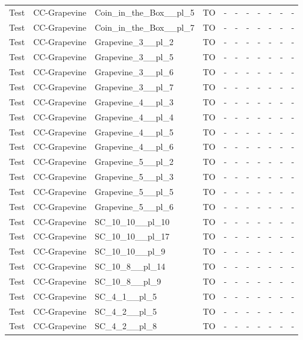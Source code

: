 \documentclass{article}
\begin{document}
\begin{tabular}{lllcccccccc}
Test & CC-Grapevine & Coin\_in\_the\_Box\_\_pl\_5 & TO & - & - & - & - & - & - & - \\
Test & CC-Grapevine & Coin\_in\_the\_Box\_\_pl\_7 & TO & - & - & - & - & - & - & - \\
Test & CC-Grapevine & Grapevine\_3\_\_pl\_2 & TO & - & - & - & - & - & - & - \\
Test & CC-Grapevine & Grapevine\_3\_\_pl\_5 & TO & - & - & - & - & - & - & - \\
Test & CC-Grapevine & Grapevine\_3\_\_pl\_6 & TO & - & - & - & - & - & - & - \\
Test & CC-Grapevine & Grapevine\_3\_\_pl\_7 & TO & - & - & - & - & - & - & - \\
Test & CC-Grapevine & Grapevine\_4\_\_pl\_3 & TO & - & - & - & - & - & - & - \\
Test & CC-Grapevine & Grapevine\_4\_\_pl\_4 & TO & - & - & - & - & - & - & - \\
Test & CC-Grapevine & Grapevine\_4\_\_pl\_5 & TO & - & - & - & - & - & - & - \\
Test & CC-Grapevine & Grapevine\_4\_\_pl\_6 & TO & - & - & - & - & - & - & - \\
Test & CC-Grapevine & Grapevine\_5\_\_pl\_2 & TO & - & - & - & - & - & - & - \\
Test & CC-Grapevine & Grapevine\_5\_\_pl\_3 & TO & - & - & - & - & - & - & - \\
Test & CC-Grapevine & Grapevine\_5\_\_pl\_5 & TO & - & - & - & - & - & - & - \\
Test & CC-Grapevine & Grapevine\_5\_\_pl\_6 & TO & - & - & - & - & - & - & - \\
Test & CC-Grapevine & SC\_10\_10\_\_pl\_10 & TO & - & - & - & - & - & - & - \\
Test & CC-Grapevine & SC\_10\_10\_\_pl\_17 & TO & - & - & - & - & - & - & - \\
Test & CC-Grapevine & SC\_10\_10\_\_pl\_9 & TO & - & - & - & - & - & - & - \\
Test & CC-Grapevine & SC\_10\_8\_\_pl\_14 & TO & - & - & - & - & - & - & - \\
Test & CC-Grapevine & SC\_10\_8\_\_pl\_9 & TO & - & - & - & - & - & - & - \\
Test & CC-Grapevine & SC\_4\_1\_\_pl\_5 & TO & - & - & - & - & - & - & - \\
Test & CC-Grapevine & SC\_4\_2\_\_pl\_5 & TO & - & - & - & - & - & - & - \\
Test & CC-Grapevine & SC\_4\_2\_\_pl\_8 & TO & - & - & - & - & - & - & - \\

\end{tabular}
\end{document}

